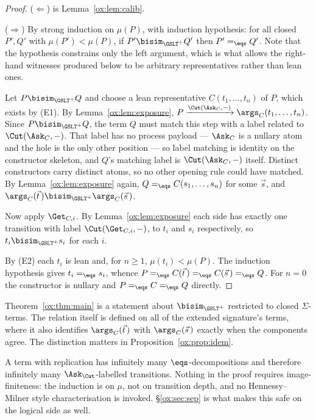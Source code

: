\begin{proof}
($\Leftarrow$) is Lemma~\ref{ox:lem:calib}.

($\Rightarrow$) By strong induction on $\mu(P)$, with induction hypothesis: for all
closed $P',Q'$ with $\mu(P') < \mu(P)$, if $P' \bisim_{\GSLT^{+}} Q'$ then
$P' =_{\eqs} Q'$. Note that the hypothesis constrains only the left argument, which
is what allows the right-hand witnesses produced below to be arbitrary
representatives rather than lean ones.

Let $P \bisim_{\GSLT^{+}} Q$ and choose a lean representative $C(t_1,\dots,t_n)$ of
$P$, which exists by (E1). By Lemma~\ref{ox:lem:exposure},
$P \xrightarrow{\Cut(\Ask_C,-)} \args_C(t_1,\dots,t_n)$. Since
$P \bisim_{\GSLT^{+}} Q$, the term $Q$ must match this step with a label related to
$\Cut(\Ask_C,-)$. That label has no process payload --- $\Ask_C$ is a nullary atom
and the hole is the only other position --- so label matching is identity on the
constructor skeleton, and $Q$'s matching label is $\Cut(\Ask_C,-)$ itself. Distinct
constructors carry distinct atoms, so no other opening rule could have matched. By
Lemma~\ref{ox:lem:exposure} again, $Q =_{\eqs} C(s_1,\dots,s_n)$ for some $\vec s$,
and $\args_C(\vec t\,) \bisim_{\GSLT^{+}} \args_C(\vec s\,)$.

Now apply $\Get_{C,i}$. By Lemma~\ref{ox:lem:exposure} each side has exactly one
transition with label $\Cut(\Get_{C,i},-)$, to $t_i$ and $s_i$ respectively, so
$t_i \bisim_{\GSLT^{+}} s_i$ for each $i$.

By (E2) each $t_i$ is lean and, for $n \ge 1$, $\mu(t_i) < \mu(P)$. The induction
hypothesis gives $t_i =_{\eqs} s_i$, whence
$P =_{\eqs} C(\vec t\,) =_{\eqs} C(\vec s\,) =_{\eqs} Q$. For $n = 0$ the
constructor is nullary and $P =_{\eqs} C =_{\eqs} Q$ directly.
\end{proof}

\begin{remark}[Domains]
\label{ox:rem:domains}
Theorem~\ref{ox:thm:main} is a statement about $\bisim_{\GSLT^{+}}$ restricted to
closed $\Sigma$-terms. The relation itself is defined on all of the extended
signature's terms, where it also identifies $\args_C(\vec t\,)$ with
$\args_C(\vec s\,)$ exactly when the components agree. The distinction matters in
Proposition~\ref{ox:prop:idem}.
\end{remark}

\begin{remark}
\label{ox:rem:branching}
A term with replication has infinitely many $\eqs$-decompositions and therefore
infinitely many $\Ask_{\Cut}$-labelled transitions. Nothing in the proof requires
image-finiteness: the induction is on $\mu$, not on transition depth, and no
Hennessy--Milner style characterisation is invoked. \S\ref{ox:sec:sep} is what
makes this safe on the logical side as well.
\end{remark}

